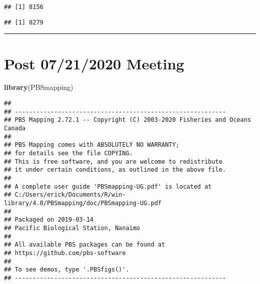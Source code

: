 \documentclass[
]{article}
\newenvironment{Shaded}{\begin{snugshade}}{\end{snugshade}}
\newcommand{\CommentTok}[1]{\textcolor[rgb]{0.56,0.35,0.01}{\textit{#1}}}
\newcommand{\KeywordTok}[1]{\textcolor[rgb]{0.13,0.29,0.53}{\textbf{#1}}}
\newcommand{\NormalTok}[1]{#1}
\newcommand{\OperatorTok}[1]{\textcolor[rgb]{0.81,0.36,0.00}{\textbf{#1}}}
\newcommand{\StringTok}[1]{\textcolor[rgb]{0.31,0.60,0.02}{#1}}
\begin{document}
\begin{Shaded}
\end{Shaded}

\begin{verbatim}
## [1] 8156
\end{verbatim}

\begin{Shaded}
\end{Shaded}

\begin{verbatim}
## [1] 8279
\end{verbatim}

\begin{center}\rule{0.5\linewidth}{0.5pt}\end{center}

\hypertarget{post-07212020-meeting}{%
\section{Post 07/21/2020 Meeting}\label{post-07212020-meeting}}

\begin{Shaded}
\begin{Highlighting}[]
\KeywordTok{library}\NormalTok{(PBSmapping)}
\end{Highlighting}
\end{Shaded}

\begin{verbatim}
## 
## -----------------------------------------------------------
## PBS Mapping 2.72.1 -- Copyright (C) 2003-2020 Fisheries and Oceans Canada
## 
## PBS Mapping comes with ABSOLUTELY NO WARRANTY;
## for details see the file COPYING.
## This is free software, and you are welcome to redistribute
## it under certain conditions, as outlined in the above file.
## 
## A complete user guide 'PBSmapping-UG.pdf' is located at 
## C:/Users/erick/Documents/R/win-library/4.0/PBSmapping/doc/PBSmapping-UG.pdf
## 
## Packaged on 2019-03-14
## Pacific Biological Station, Nanaimo
## 
## All available PBS packages can be found at
## https://github.com/pbs-software
## 
## To see demos, type '.PBSfigs()'.
## -----------------------------------------------------------
\end{verbatim}
\end{document}
